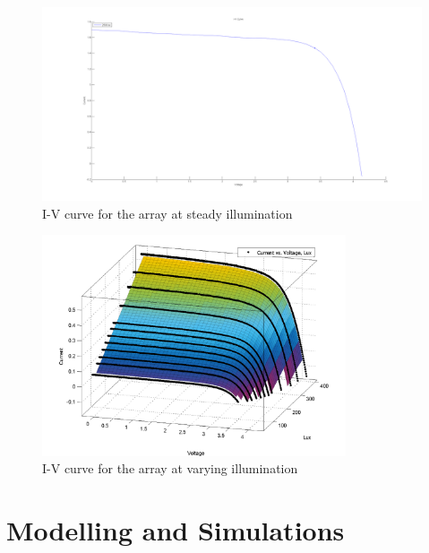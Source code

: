   \begin{figure}[H]
	  \begin{center}
		  \includegraphics[width=1.1\textwidth]{images/single2500_IV}
		  \caption{I-V curve for the array at steady illumination}
		  \label{fig:2500luxIV}
	  \end{center}
  \end{figure}
  
\begin{figure}[H]
	  \begin{center}
		  \includegraphics[width=0.8\textwidth]{images/I-V-lux}
		  \caption{I-V curve for the array at varying illumination}
		  \label{fig:luxIV100_2500}
	  \end{center}
  \end{figure}

\section{Modelling and Simulations} 

